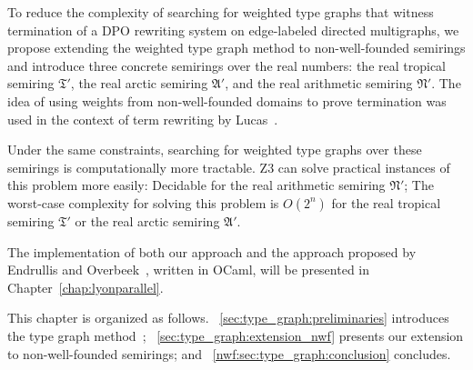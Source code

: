 To reduce the complexity of searching for weighted type graphs that witness termination of a DPO rewriting system on edge-labeled directed multigraphs, we propose extending the weighted type graph method to non-well-founded semirings and introduce three concrete semirings over the real numbers: the real tropical semiring $\mathfrak{T}'$, the real arctic semiring $\mathfrak{A}'$, and the real arithmetic semiring $\mathfrak{N}'$. The idea of using weights from non-well-founded domains to prove termination was used in the context of term rewriting by Lucas~\cite{lucas2006relative}.

Under the same constraints, searching for weighted type graphs over these semirings is computationally more tractable.
Z3 can solve practical instances of this problem more easily: Decidable for the real arithmetic semiring $\mathfrak{N}'$;
The worst-case complexity for solving this problem is $O(2^n)$ for the real tropical semiring $\mathfrak{T}'$ or the real arctic semiring $\mathfrak{A}'$.

The implementation of both our approach and the approach proposed by Endrullis and Overbeek~\cite{endrullis2024generalized_icgt}, written in OCaml, will be presented in Chapter~\ref{chap:lyonparallel}.

This chapter is organized as follows.
\textsection~\ref{sec:type_graph:preliminaries} introduces the type graph method~\cite{endrullis2024generalized_icgt}; \textsection~\ref{sec:type_graph:extension_nwf} presents our extension to non-well-founded semirings; and \textsection~\ref{nwf:sec:type_graph:conclusion} concludes.